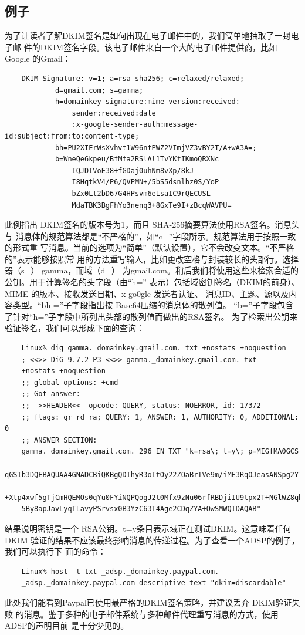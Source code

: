 \subsection{例子}
为了让读者了解DKIM签名是如何出现在电子邮件中的，我们简单地抽取了一封电子邮
件的DKIM签名字段。该电子邮件来自一个大的电子邮件提供商，比如 Google 的Gmail：
\begin{verbatim}
    DKIM-Signature: v=1; a=rsa-sha256; c=relaxed/relaxed;
            d=gmail.com; s=gamma;
            h=domainkey-signature:mime-version:received:
                sender:received:date
                :x-google-sender-auth:message-id:subject:from:to:content-type;
            bh=PU2XIErWsXvhvt1W96ntPWZ2VImjVZ3vBY2T/A+wA3A=;
            b=WneQe6kpeu/BfMfa2RSlAl1TvYKfIKmoQRXNc
                IQJDIVoE38+fGDaj0uhNm8vXp/8kJ
                I8HqtkV4/P6/QVPMN+/5bS5dsnlhz0S/YoP
                bZx0Lt2bD67G4HPsvm6eLsaIC9rQECUSL
                MdaTBK3BgFhYo3nenq3+8GxTe9I+zBcqWAVPU=
\end{verbatim}
此例指出 DKIM签名的版本号为1，而且 SHA-256摘要算法使用RSA签名。消息头与
消息体的规范算法都是“不严格的”，如“c=”字段所示。规范算法用于按照一致的形式重
写消息。当前的选项为“简单”（默认设置），它不会改变文本。“不严格的”表示能够按照常
用的方法重写输人，比如更改空格与封装较长的头部行。选择器（s=） gamma，而域（d=）
为gmail.com。稍后我们将使用这些来检索合适的公钥。用于计算签名的头字段（由“h=”
表示）包括域密钥签名（DKIM的前身）、MIME 的版本、接收发送日期、x-go0gle 发送者认证、
消息ID、主题、源以及内容类型。“bh =”子字段指出按 Base64压缩的消息体的散列值。
“b=”子字段包含了针对“h=”子字段中所列出头部的散列值而做出的RSA签名。
为了检索出公钥来验证签名，我们可以形成下面的查询：
\begin{verbatim}
    Linux% dig gamma._domainkey.gmail.com. txt +nostats +noquestion
    ; <<>> DiG 9.7.2-P3 <<>> gamma._domainkey.gmail.com. txt
    +nostats +noquestion
    ;; global options: +cmd
    ;; Got answer:
    ;; ->>HEADER<<- opcode: QUERY, status: NOERROR, id: 17372
    ;; flags: qr rd ra; QUERY: 1, ANSWER: 1, AUTHORITY: 0, ADDITIONAL: 0
    ;; ANSWER SECTION:
    gamma._domainkey.gmail.com. 296 IN TXT "k=rsa\; t=y\; p=MIGfMA0GCS
    qGSIb3DQEBAQUAA4GNADCBiQKBgQDIhyR3oItOy22ZOaBrIVe9m/iME3RqOJeasANSpg2YTHTYV
    +Xtp4xwf5gTjCmHQEMOs0qYu0FYiNQPQogJ2t0Mfx9zNu06rfRBDjiIU9tpx2T+NGlWZ8qhbiLo
    5By8apJavLyqTLavyPSrvsx0B3YzC63T4Age2CDqZYA+OwSMWQIDAQAB"
\end{verbatim}
结果说明密钥是一个 RSA公钥。t=y条目表示域正在测试DKIM。这意味着任何 DKIM
验证的结果不应该最终影响消息的传递过程。为了查看一个ADSP的例子，我们可以执行下
面的命令：
\begin{verbatim}
    Linux% host –t txt _adsp._domainkey.paypal.com.
    _adsp._domainkey.paypal.com descriptive text "dkim=discardable"
\end{verbatim}
此处我们能看到Paypal已使用最严格的DKIM签名策略，并建议丢弃 DKIM验证失败
的消息。鉴于多种的电子邮件系统与多种邮件代理重写消息的方式，使用ADSP的声明目前
是十分少见的。

